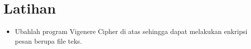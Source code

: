 \documentclass{article}
\begin{document}

\section*{Latihan}

\begin{itemize}
    \item Ubahlah program Vigenere Cipher di atas sehingga dapat melakukan enkripsi pesan berupa file teks.
\end{itemize}
\end{document}
